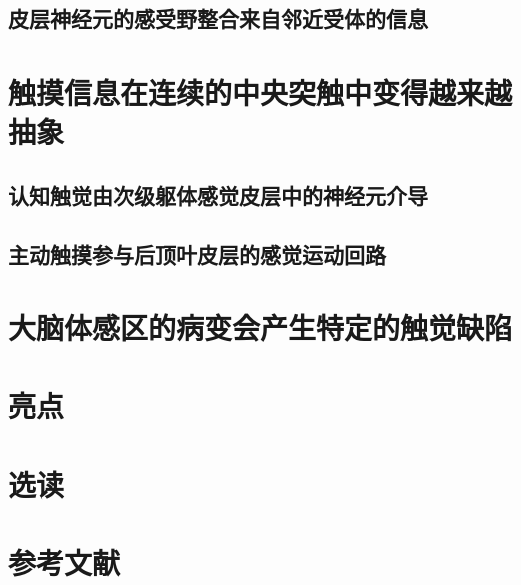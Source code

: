 \subsection{皮层神经元的感受野整合来自邻近受体的信息}

\section{触摸信息在连续的中央突触中变得越来越抽象}
\subsection{认知触觉由次级躯体感觉皮层中的神经元介导}
\subsection{主动触摸参与后顶叶皮层的感觉运动回路}

\section{大脑体感区的病变会产生特定的触觉缺陷}

\section{亮点}
\section{选读}
\section{参考文献}
